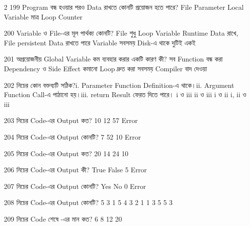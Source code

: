 \begin{multicols}{2}
\mcq
{199}
{Program বন্ধ হওয়ার পরও Data রাখতে কোনটি প্রয়োজন হতে পারে?}
{File}
{Parameter}
{Local Variable মাত্র}
{Loop Counter}

\mcqwide
{200}
{Variable ও File-এর মূল পার্থক্য কোনটি?}
{File শুধু Loop}
{Variable Runtime Data রাখে, File persistent Data রাখতে পারে}
{Variable সবসময় Disk-এ থাকে}
{দুটিই একই}

\mcqwide
{201}
{অপ্রয়োজনীয় Global Variable কম ব্যবহার করার একটি কারণ কী?}
{সব Function বন্ধ করা}
{Dependency ও Side Effect কমানো}
{Loop দ্রুত করা সবসময়}
{Compiler বাদ দেওয়া}

\mcqwide
{202}
{নিচের কোন বক্তব্যটি সঠিক?\newline i. Parameter Function Definition-এ থাকে।\newline ii. Argument Function Call-এ পাঠানো হয়।\newline iii. return Result ফেরত দিতে পারে।}
{i ও iii}
{ii ও iii}
{i ও ii}
{i, ii ও iii}


\mcqwide
{203}
{নিচের Code-এর Output কত?}
{10}
{12}
{57}
{Error}

\mcqwide
{204}
{নিচের Code-এর Output কোনটি?}
{7}
{52}
{10}
{Error}

\mcqwide
{205}
{নিচের Code-এর Output কত?}
{20}
{14}
{24}
{10}

\mcqwide
{206}
{নিচের Code-এর Output কী?}
{True}
{False}
{5}
{Error}

\mcqwide
{207}
{নিচের Code-এর Output কোনটি?}
{Yes}
{No}
{0}
{Error}

\mcqwide
{208}
{নিচের Code-এর Output কোনটি?}
{5 3 1}
{5 4 3 2 1}
{1 3 5}
{5 3}

\mcqwide
{209}
{নিচের Code শেষে -এর মান কত?}
{6}
{8}
{12}
{20}


\end{multicols}
